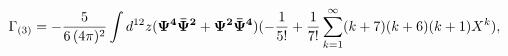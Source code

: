 \begin{equation} \Gamma_{(3)}=-{5\over 6\,(4\pi)^{2}}\int
d^{12}z ({\bf\Psi^{4}\bar{\Psi}^{2}+\Psi^{2}\bar{\Psi}^{4}})(-{1\over
5!} + {1\over 7 !}\sum_{k=1}^{\infty}(k+7)(k+6)(k+1)X^{k}),
\end{equation}

